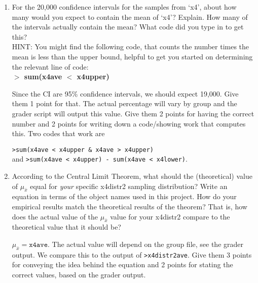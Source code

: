 \documentclass{article}
\newcommand{\Rin}[1]{\textbf{$>$ {#1}}}
\newcommand{\answer}[1]{\color{red}#1}
\begin{document}
{{\begin{enumerate}
    {\answer Answers will vary by group. The grader script will output these values. Give 1 point for the mean of the sample, 1 point for each bound of the interval, 1 point for the mean of x4 and 1 point for the proper determination if the confidence interval contains the mean.}
    
    \vfill

\item For the 20,000 confidence intervals for the samples from `x4', about how many would you expect to contain the mean of `x4'? Explain.
How many of the intervals actually contain the mean? What code did you type in to get this? \\
HINT: You might find the following code, that counts the number times the mean is less than the upper bound, helpful to get you started on determining the relevant line of code:\\
  \Rin{sum(x4ave $<$ x4upper)}
  
  {\answer Since the CI are 95\% confidence intervals, we should expect 19,000. Give them 1 point for that. The actual percentage will vary by group and the grader script will output this value. Give them 2 points for having the correct number and 2 points for writing down a code/showing work that computes this. Two codes that work are 
  \begin{center}
  \texttt{>sum(x4ave < x4upper \& x4ave > x4upper)}\\
  and \texttt{>sum(x4ave < x4upper) - sum(x4ave < x4lower)}.
  \end{center}
  }
  
  \vfill

\item According to the Central Limit Theorem, what should the (theoretical) value of $\mu_{\bar{x}}$ equal for {\em your} specific x4distr2 sampling distribution? Write an equation in terms of the object names used in this project. How do your empirical results match the theoretical results of the theorem? That is, how does the actual value of the $\mu_{\bar{x}}$ value for your x4distr2 compare to the theoretical value that it should be?

    {\answer $\mu_{\bar{x}} = \texttt{x4ave}$. The actual value will depend on the group file, see the grader output. We compare this to the output of \texttt{>x4distr2ave}. Give them 3 points for conveying the idea behind the equation and 2 points for stating the correct values, based on the grader output.}
    
  \vfill
  

\end{enumerate}}}
\end{document}
